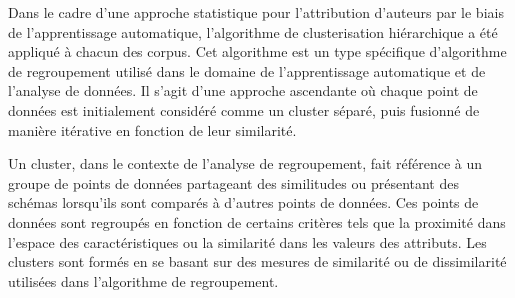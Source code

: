 \vspace{\baselineskip}
\hspace{0,5cm}Dans le cadre d'une approche statistique pour l'attribution d'auteurs par le
biais de l'apprentissage automatique, l'algorithme de
clusterisation hiérarchique a été appliqué à chacun des corpus. Cet
algorithme est un type spécifique d'algorithme de regroupement utilisé dans le
domaine de l'apprentissage automatique et de l'analyse de données. Il s'agit
d'une approche ascendante où chaque point de données est initialement considéré
comme un cluster séparé, puis fusionné de manière itérative en fonction de leur
similarité.

\hspace{0,5cm}Un cluster, dans le contexte de l'analyse de regroupement, fait
référence à un groupe de points de données partageant des similitudes ou
présentant des schémas lorsqu'ils sont comparés à d'autres points de données.
Ces points de données sont regroupés en fonction de certains critères tels que
la proximité dans l'espace des caractéristiques ou la similarité dans les
valeurs des attributs. Les clusters sont formés en se basant sur des mesures de
similarité ou de dissimilarité utilisées dans l'algorithme de regroupement.